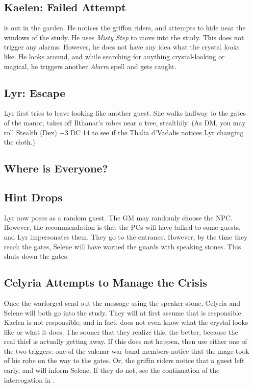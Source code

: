 \documentclass[twocolumn]{dndbook}
\begin{document}
\subsection{Kaelen: Failed Attempt}
 is out in the garden. He notices the griffon riders, and attempts to hide near the windows of the study.
He uses \emph{Misty Step} to move into the study. This does not trigger any alarms.
However, he does not have any idea what the crystal looks like.
He looks around, and while searching for anything crystal-looking or magical, he triggers another \emph{Alarm} spell and gets caught.

\subsection{Lyr: Escape}
\label{subsec:lyr_tries_to_leave}

Lyr first tries to leave looking like another guest.
She walks halfway to the gates of the manor,
takes off Ilthanar's robes near a tree, stealthily.
(As DM, you may roll Stealth (Dex) +3 DC 14 to see if the Thalia d'Vadalis notices Lyr changing the cloth.)


\subsection{Where is Everyone?}
\subsection{Hint Drops}





Lyr now poses as a random guest.
The GM may randomly choose the NPC. However, the recommendation is that the PCs will have talked to some guests, and Lyr impersonates them.
They go to the entrance. However, by the time they reach the gates, Selene will have warned the guards with speaking stones.
This shuts down the gates.

\subsection{Celyria Attempts to Manage the Crisis}
\label{subsec:celyria_attempts_to_manage_the_crisis}
Once the warforged send out the message using the speaker stone, Celyria and Selene will both go into the study.
They will at first assume that  is responsible. Kaelen is not responsible, and in fact, does not even know what the crystal looks like or what it does.
The sooner that they realize this, the better, because the real thief is actually getting away.
If this does not happen, then use either one of the two triggers: one of the valenar war band members notice that the mage took of his robe on the way to the gates.
Or, the griffin riders notice that a guest left early, and will inform Selene.
If they do not, see the continuation of the interrogation in .
\end{document}
